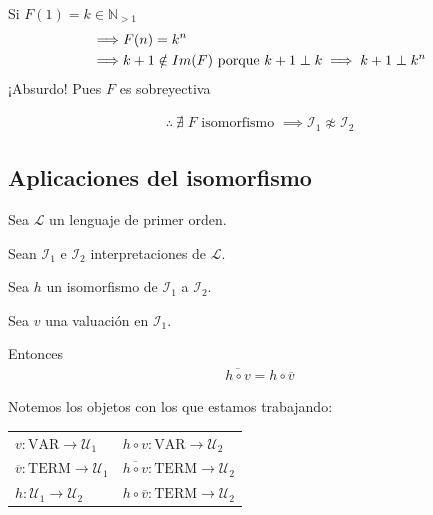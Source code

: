 \begin{itemize}
        Si $F(1) = k \in \mathbb{N}_{>1}$
        \begin{align*}
            \implies& F(n) = k^n \\
            \implies& k+1 \notin Im(F)
            \text{ porque } \coprime{k+1}{k} \implies \coprime{k+1}{k^n}
        \end{align*}
        ¡Absurdo! Pues $F$ es sobreyectiva

        \begin{gather*}
            \therefore ~ \nexists \; F \text{ isomorfismo } \implies
            \mathcal{I}_1 \not\approx \mathcal{I}_2
        \end{gather*}
\end{itemize}

\subsection{Aplicaciones del isomorfismo}

\begin{lema}{}{}
    Sea $\mathcal{L}$ un lenguaje de primer orden.

    Sean $\mathcal{I}_1$ e $\mathcal{I}_2$ interpretaciones de $\mathcal{L}$.

    Sea $h$ un isomorfismo de $\mathcal{I}_1$ a $\mathcal{I}_2$.
    
    Sea $v$ una valuación en $\mathcal{I}_1$.

    \medskip

    Entonces
    \begin{gather*}
        \overline{h \circ v} = h \circ \overline{v}
    \end{gather*}
\end{lema}

Notemos los objetos con los que estamos trabajando:

\begin{center}
\begin{tabular}{l | l}
    $v: \mathrm{VAR} \to \mathcal{U}_1$ & $h \circ v: \mathrm{VAR} \to \mathcal{U}_2$\\
    $\overline{v}:  \mathrm{TERM} \to \mathcal{U}_1$ 
    & $\overline{h \circ v}:  \mathrm{TERM} \to \mathcal{U}_2$\\
    $h: \mathcal{U}_1 \to \mathcal{U}_2$ 
    & $h \circ \overline{v}:  \mathrm{TERM} \to \mathcal{U}_2$\\
\end{tabular}
\end{center}


